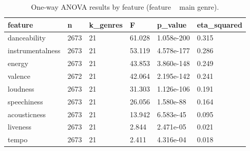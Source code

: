 \begin{table}[t]
\centering
\caption{One-way ANOVA results by feature (feature ~ main genre).}
\label{tab:anova\_features}
\begin{tabular}{|l|l|l|l|l|l|}
\hline
feature & n & k\_genres & F & p\_value & eta\_squared \\ \hline
danceability & 2673 & 21 & 61.028 & 1.058e-200 & 0.315 \\
instrumentalness & 2673 & 21 & 53.119 & 4.578e-177 & 0.286 \\
energy & 2673 & 21 & 43.853 & 3.860e-148 & 0.249 \\
valence & 2672 & 21 & 42.064 & 2.195e-142 & 0.241 \\
loudness & 2673 & 21 & 31.303 & 1.126e-106 & 0.191 \\
speechiness & 2673 & 21 & 26.056 & 1.580e-88 & 0.164 \\
acousticness & 2673 & 21 & 13.942 & 6.583e-45 & 0.095 \\
liveness & 2673 & 21 & 2.844 & 2.471e-05 & 0.021 \\
tempo & 2673 & 21 & 2.411 & 4.316e-04 & 0.018 \\
\hline
\end{tabular}
\end{table}